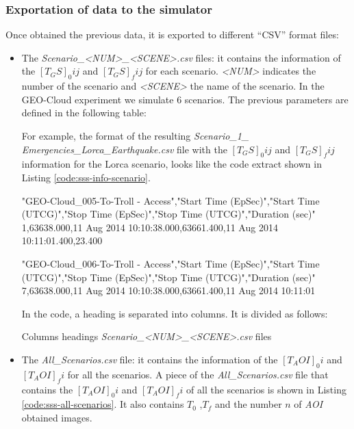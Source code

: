 \subsubsection{Exportation of data to the simulator}

Once obtained the previous data, it is exported to different ``CSV'' format files: 

\begin{itemize}
\item 	The \emph{Scenario\_<NUM>\_<SCENE>.csv} files: it contains the information
  of the $[T_GS]_0ij$ and $[T_GS]_fij$ for each scenario. \emph{<NUM>} indicates
  the number of the scenario and \emph{<SCENE>} the name of the scenario. In the
  GEO-Cloud experiment we simulate 6 scenarios. The previous parameters are
  defined in the following table:


For example, the format of the resulting \emph{Scenario\_1\_
Emergencies\_Lorca\_Earthquake.csv} file with the $[T_GS]_0ij$ and $[T_GS]_fij$
information for the Lorca scenario, looks like the code extract shown in Listing
\ref{code:sss-info-scenario}.

\begin{listing}[
  float=h!,
  caption  = {Extract of the \emph{Scenario\_1\_Emergencies\_Lorca\_Earthquake.csv}
    of the Lorca scenario},
  label    = code:sss-info-scenario]
"GEO-Cloud_005-To-Troll - Access","Start Time (EpSec)","Start Time (UTCG)","Stop Time (EpSec)","Stop Time (UTCG)","Duration (sec)"
1,63638.000,11 Aug 2014 10:10:38.000,63661.400,11 Aug 2014 10:11:01.400,23.400

"GEO-Cloud_006-To-Troll - Access","Start Time (EpSec)","Start Time (UTCG)","Stop Time (EpSec)","Stop Time (UTCG)","Duration (sec)"
7,63638.000,11 Aug 2014 10:10:38.000,63661.400,11 Aug 2014 10:11:01

\end{listing}

In the code, a heading is separated into columns. It is divided as follows: 


\begin{table}[hp]
  \centering
  {\small
  
  }
  \caption{Columns headings \emph{Scenario\_<NUM>\_<SCENE>.csv} files}
  \label{table:sss-headings-scenario2}
\end{table}

\item 	The \emph{All\_Scenarios.csv} file: it contains the information of the $[T_AOI]_0i$ and $[T_AOI]_fi$ for all the scenarios.
A piece of the \emph{All\_Scenarios.csv} file that contains the $[T_AOI]_0i$ and $[T_AOI]_fi$ of all the scenarios is shown in Listing \ref{code:sss-all-scenarios}.  It also contains  $T_0$ ,$T_f$ and the number $n$ of \emph{AOI} obtained images.



\end{itemize}

